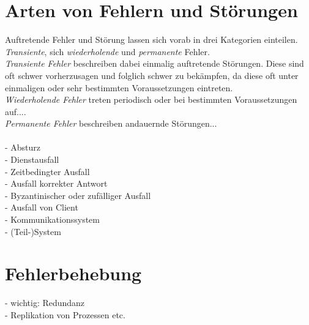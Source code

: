 \documentclass[12pt,a4paper,parskip=half]{scrreprt}
\begin{document}
\section{Arten von Fehlern und Störungen}
Auftretende Fehler und Störung lassen sich vorab in drei Kategorien einteilen. \textit{Transiente}, sich \textit{wiederholende} und \textit{permanente} Fehler.\\
\textit{Transiente Fehler} beschreiben dabei einmalig auftretende Störungen. Diese sind oft schwer vorherzusagen und folglich schwer zu bekämpfen, da diese oft unter einmaligen oder sehr bestimmten Voraussetzungen eintreten.\\
\textit{Wiederholende Fehler} treten periodisch oder bei bestimmten Voraussetzungen auf....\\
\textit{Permanente Fehler} beschreiben andauernde Störungen...\\


~\\
- Absturz\\
- Dienstausfall\\
- Zeitbedingter Ausfall\\
- Ausfall korrekter Antwort\\
- Byzantinischer oder zufälliger Ausfall
\\
- Ausfall von Client\\
- Kommunikationssystem\\
- (Teil-)System\\

\section{Fehlerbehebung}
- wichtig: Redundanz\\
- Replikation von Prozessen etc.\\



\newpage

\nocite{*}
\thispagestyle{headings}


 
\end{document}
